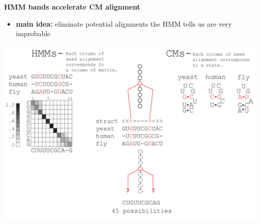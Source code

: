 \documentclass[landscape]{slides}
\begin{document}
\begin{slide}
\begin{center}

\textbf{HMM bands accelerate CM alignment}
\end{center}
\medskip
\small
\begin{itemize}
\item
\textbf{main idea:} eliminate potential alignments the HMM tells us are very improbable
\end{itemize}
\begin{center}
\includegraphics[width=8in]{figs/post_hmm_to_cm_map2_layer14}
\end{center}
\vfill
\end{slide}
\end{document}
